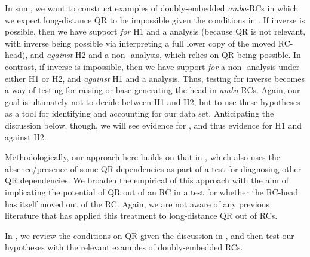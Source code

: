\documentclass[output=paper,modfonts,nonflat,hidelinks]{langsci/langscibook}
\begin{document}
\largerpage[-2]
In sum, we want to construct examples of doubly-embedded \textit{amba}{}-RCs in which we expect long-distance QR to be impossible given the conditions in \citet{Fox2000}. If inverse  is possible, then we have support \textit{for} H1 and a  analysis (because QR is not relevant, with inverse  being possible via interpreting a full lower copy of the moved RC-head), and \textit{against} H2 and a non- analysis, which relies on QR being possible. In contrast, if inverse  is impossible, then we have support \textit{for} a non- analysis under either H1 or H2, and \textit{against} H1 and a  analysis. Thus, testing for inverse  becomes a way of testing for raising or base-generating the head in \textit{amba}{}-RCs. Again, our goal is ultimately not to decide between H1 and H2, but to use these hypotheses as a tool for identifying  and accounting for our data set. Anticipating the discussion below, though, we will see evidence for , and thus evidence for H1 and against H2.

Methodologically, our approach here builds on that in \citet{Fox2000}, which also uses the absence/presence of some QR dependencies as part of a test for diagnosing other QR dependencies. We broaden the empirical  of this approach with the aim of implicating the potential of QR out of an RC in a test for whether the RC-head has itself moved out of the RC. Again, we are not aware of any previous literature that has applied this treatment to long-distance QR out of RCs. 

In , we review the conditions on QR given the discussion in \citet{Fox2000}, and then test our hypotheses with the relevant examples of doubly-embedded RCs.
\end{document}
